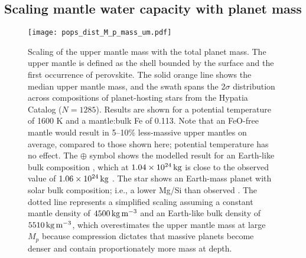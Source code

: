 
\subsection{Scaling mantle water capacity with planet mass}



\begin{figure}
    \centering
    \texttt{[image: pops\_dist\_M\_p\_mass\_um.pdf]}
    \caption[Scaling of the upper mantle mass with the total planet mass.]{Scaling of the upper mantle mass with the total planet mass. The upper mantle is defined as the shell bounded by the surface and the first occurrence of perovskite. The solid orange line shows the median upper mantle mass, and the swath spans the 2$\sigma$ distribution across compositions of planet-hosting stars from the Hypatia Catalog ($N = 1285$). Results are shown for a potential temperature of 1600 K and a mantle:bulk Fe of 0.113. Note that an FeO-free mantle would result in 5--10\% less-massive upper mantles on average, compared to those shown here; potential temperature has no effect. The $\oplus$ symbol shows the modelled result for an Earth-like bulk composition \citep{mcdonough_composition_1995}, which at $1.04 \times 10^{24}\,{\rm kg}$ is close to the observed value of $1.06 \times 10^{24}\,{\rm kg}$ \citep{nolet_earth_2011}. The star shows an Earth-mass planet with solar bulk composition; i.e., a lower Mg/Si than observed \citep{lodders_abundances_2009}. The dotted line represents a simplified scaling assuming a constant mantle density of $4500\,{\rm kg\,m^{-3}}$ and an Earth-like bulk density of $5510\,{\rm kg\,m^{-3}}$, which overestimates the upper mantle mass at large $M_p$ because compression dictates that massive planets become denser and contain proportionately more mass at depth.}
    \label{fig:mass_um}
\end{figure}


